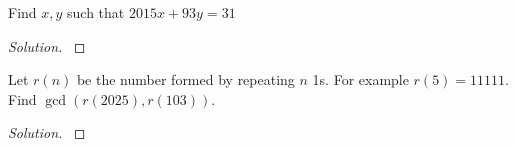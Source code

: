\documentclass[11pt]{article}
\newenvironment{problem}[2][Problem]{\begin{trivlist}
\item[\hskip \labelsep {\bfseries #1}\hskip \labelsep {\bfseries #2.}]}{\end{trivlist}}
\newenvironment{solution}
  {\renewcommand\qedsymbol{$~$}\begin{proof}[Solution]$ $\par\nobreak\ignorespaces}
  {\end{proof}}
\begin{document}
\begin{problem}{B} 
Find $x,y$ such that $2015x+93y=31$
\end{problem}

\begin{solution}


%
\end{solution}


\begin{problem}{C (Extra Credit)}
Let $r(n)$ be the number formed by repeating $n$ 1s. For example $r(5)=11111$. Find $\gcd(r(2025),r(103))$.

\end{problem}

\begin{solution}


%
\end{solution}
\end{document}
